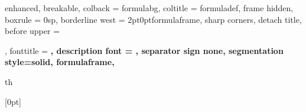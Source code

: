 

{%
  enhanced,
  breakable,
  colback = formulabg,
  coltitle = formuladef,
  frame hidden,
  boxrule = 0sp,
  borderline west = {2pt}{0pt}{formulaframe},
  sharp corners,
  detach title,
  before upper = \tcbtitle\par\smallskip,
  fonttitle = \bfseries\sffamily,
  description font = \mdseries,
  separator sign none,
  segmentation style={solid, formulaframe},
}
{th}

\newcommand{\formula}[1]
{%
  \begin{Formula}{}{}
    #1
  \end{Formula}
}%

[0pt]{\normalsize\bfseries\protect\addvspace{15pt}}%
{}{\partname{} }%
{\enspace\titlerule\contentspage}%
